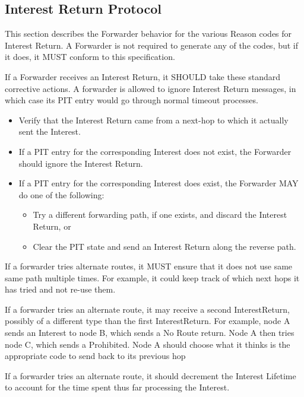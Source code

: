 \documentclass[12pt]{article}
\begin{document}
\subsection{Interest Return Protocol}
This section describes the Forwarder behavior for the various Reason
codes for Interest Return.  A Forwarder is not required to generate
any of the codes, but if it does, it MUST conform to this
specification.

If a Forwarder receives an Interest Return, it SHOULD take these
standard corrective actions.  A forwarder is allowed to ignore
Interest Return messages, in which case its PIT entry would go
through normal timeout processes.

\begin{itemize}
\item  Verify that the Interest Return came from a next-hop to which it
   actually sent the Interest.

\item  If a PIT entry for the corresponding Interest does not exist, the
   Forwarder should ignore the Interest Return.

\item  If a PIT entry for the corresponding Interest does exist, the
   Forwarder MAY do one of the following:
\begin{itemize}
   \item  Try a different forwarding path, if one exists, and discard the
      Interest Return, or

   \item Clear the PIT state and send an Interest Return along the
      reverse path.
\end{itemize}
\end{itemize}

If a forwarder tries alternate routes, it MUST ensure that it does
not use same same path multiple times.  For example, it could keep
track of which next hops it has tried and not re-use them.

If a forwarder tries an alternate route, it may receive a second
InterestReturn, possibly of a different type than the first
InterestReturn.  For example, node A sends an Interest to node B,
which sends a No Route return.  Node A then tries node C, which sends
a Prohibited.  Node A should choose what it thinks is the appropriate
code to send back to its previous hop

If a forwarder tries an alternate route, it should decrement the
Interest Lifetime to account for the time spent thus far processing
the Interest.
\end{document}
